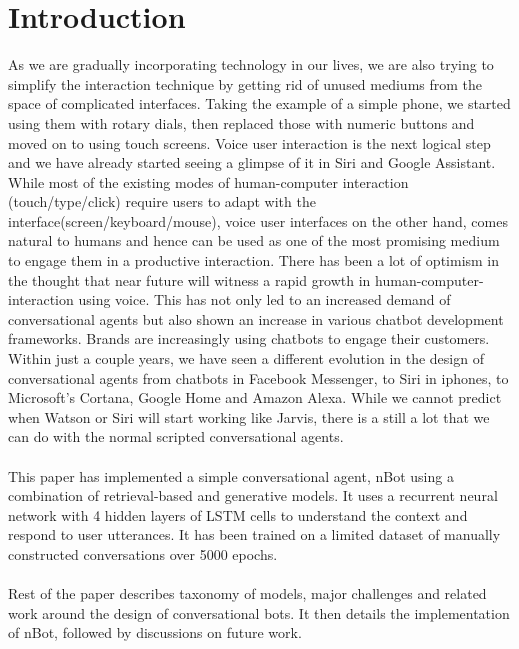 \documentclass[letterpaper] {article} %
\begin{document}
\section{Introduction}
As we are gradually incorporating technology in our lives, we are also trying to simplify the interaction technique by getting rid of unused mediums from the space of complicated interfaces. Taking the example of a simple phone, we started using them with rotary dials, then replaced those with numeric buttons and moved on to using touch screens. Voice user interaction is the next logical step and we have already started seeing a glimpse of it in Siri and Google Assistant. While most of the existing modes of human-computer interaction (touch/type/click) require users to adapt with the interface(screen/keyboard/mouse), voice user interfaces on the other hand, comes natural to humans and hence can be used as one of the most promising medium to engage them in a productive interaction. There has been a lot of optimism in the thought that near future will witness a rapid growth in human-computer-interaction using voice. This has not only led to an increased demand of conversational agents but also shown an increase in various chatbot development frameworks. Brands are increasingly using chatbots to engage their customers. Within just a couple years, we have seen a different evolution in the design of conversational agents from chatbots in Facebook Messenger, to Siri in iphones, to Microsoft's Cortana, Google Home and Amazon Alexa. While we cannot predict when Watson or Siri will start working like Jarvis, there is a still a lot that we can do with the normal scripted conversational agents.\\\\
This paper has implemented a simple conversational agent, nBot using a combination of retrieval-based and generative models. It uses a recurrent neural network with 4 hidden layers of LSTM cells to understand the context and respond to user utterances. It has been trained on a limited dataset of manually constructed conversations over 5000 epochs.\\\\
Rest of the paper describes taxonomy of models, major challenges and related work around the design of conversational bots.  It then details the implementation of nBot, followed by discussions on future work.
\end{document}
